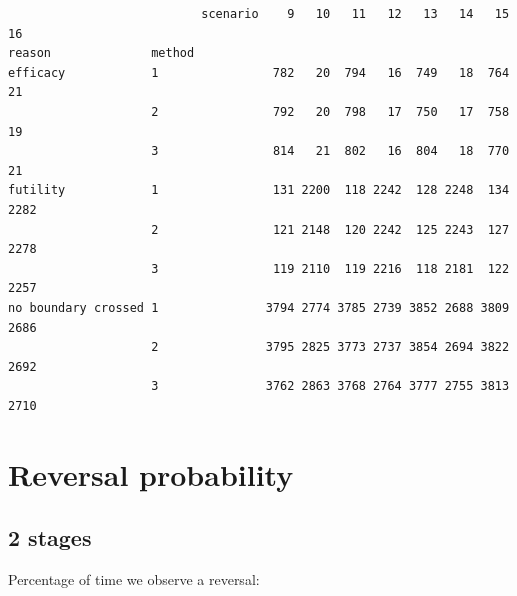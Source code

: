 \documentclass[12pt]{article}
\begin{document}
\begin{verbatim}
                           scenario    9   10   11   12   13   14   15   16
reason              method                                                 
efficacy            1                782   20  794   16  749   18  764   21
                    2                792   20  798   17  750   17  758   19
                    3                814   21  802   16  804   18  770   21
futility            1                131 2200  118 2242  128 2248  134 2282
                    2                121 2148  120 2242  125 2243  127 2278
                    3                119 2110  119 2216  118 2181  122 2257
no boundary crossed 1               3794 2774 3785 2739 3852 2688 3809 2686
                    2               3795 2825 3773 2737 3854 2694 3822 2692
                    3               3762 2863 3768 2764 3777 2755 3813 2710
\end{verbatim}

\clearpage

\section{Reversal probability}
\label{sec:orgdf46b2f}

\subsection{2 stages}
\label{sec:org13888a5}

Percentage of time we observe a reversal:
\end{document}
